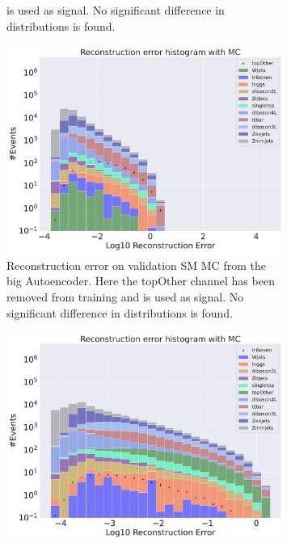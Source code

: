\begin{figure}[H]
\begin{subfigure}{.45\textwidth}
{        is used as signal. No significant difference in distributions is found. }
        \label{fig:ae_small_topOther}
    \end{subfigure}
    \hfill
    \begin{subfigure}{.45\textwidth}
        \includegraphics[width=\textwidth]{Figures/AE_testing/big/b_data_recon_big_rm3_feats_sig_topOther.pdf}
        \caption{Reconstruction error on validation SM MC from the big Autoencoder. Here the topOther channel has been removed from training and 
        is used as signal. No significant difference in distributions is found. }
        \label{fig:ae_big_topOther}
    \end{subfigure}
    \hfill
    \begin{subfigure}{.45\textwidth}
        \includegraphics[width=\textwidth]{Figures/AE_testing/small/b_data_recon_big_rm3_feats_sig_triboson.pdf}

\end{subfigure}
\end{figure}
